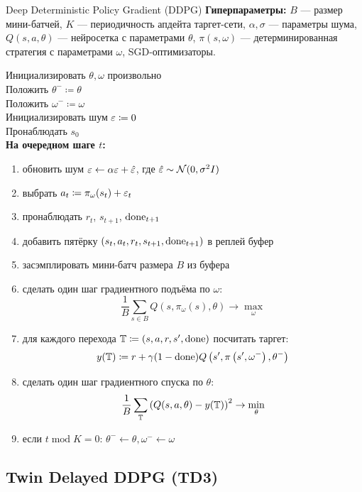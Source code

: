 \begin{algorithm}[label = DDPGalgorithm]{Deep Deterministic Policy Gradient (DDPG)}
\textbf{Гиперпараметры:} $B$ --- размер мини-батчей, $K$ --- периодичность апдейта таргет-сети, $\alpha, \sigma$ --- параметры шума, $Q(s, a, \theta)$ --- нейросетка с параметрами $\theta$, $\pi(s, \omega)$ --- детерминированная стратегия с параметрами $\omega$, SGD-оптимизаторы.

\vspace{0.3cm}
Инициализировать $\theta, \omega$ произвольно \\
Положить $\theta^- \coloneqq \theta$ \\
Положить $\omega^- \coloneqq \omega$ \\
Инициализировать шум $\varepsilon \coloneqq 0$ \\
Пронаблюдать $s_0$ \\
\textbf{На очередном шаге $t$:}
\begin{enumerate}
    \item обновить шум $\varepsilon \leftarrow \alpha \varepsilon + \hat{\varepsilon}$, где $\hat{\varepsilon} \sim \mathcal{N}(0, \sigma^2 I)$
    \item выбрать $a_t \coloneqq \pi_\omega(s_t) + \varepsilon_{t}$
    \item пронаблюдать $r_t$,  $s_{t+1}$, $\mathrm{done}_{t+1}$
    \item добавить пятёрку $(s_t, a_t, r_t, s_{t+1}, \mathrm{done}_{t+1})$ в реплей буфер
    \item засэмплировать мини-батч размера $B$ из буфера
    \item сделать один шаг градиентного подъёма по $\omega$:
    $$\frac{1}{B}\sum_{s \in B} Q(s, \pi_\omega(s), \theta) \to \max_{\omega}$$
    \item для каждого перехода $\mathbb{T} \coloneqq (s, a, r, s', \mathrm{done})$ посчитать таргет:
    $$y(\mathbb{T} ) \coloneqq r + \gamma (1 - \mathrm{done}) Q\left( s', \pi \left( s', \omega^{-}\right), \theta^{-} \right)$$
    \item сделать один шаг градиентного спуска по $\theta$:
    $$\frac{1}{B}\sum_{\mathbb{T}} \left( Q(s, a, \theta) - y(\mathbb{T} ) \right) ^2 \to \min_\theta$$
    \item если $t \operatorname{mod} K = 0$: $\theta^- \gets \theta, \omega^- \gets \omega$
\end{enumerate}
\end{algorithm}

\subsection{Twin Delayed DDPG (TD3)}\label{subsec:td3}

